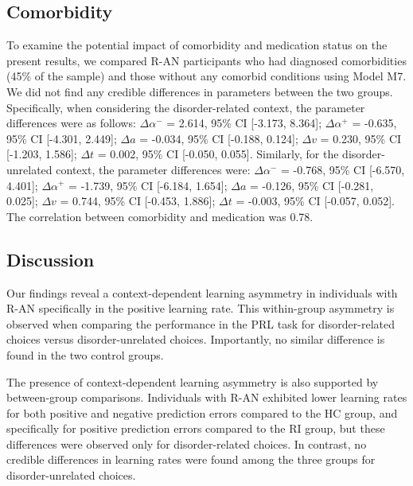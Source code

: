 \documentclass[
  man,floatsintext]{apa6}
\begin{document}
\hypertarget{comorbidity}{%
\subsection{Comorbidity}\label{comorbidity}}

To examine the potential impact of comorbidity and medication status on the present results, we compared R-AN participants who had diagnosed comorbidities (45\% of the sample) and those without any comorbid conditions using Model M7. We did not find any credible differences in parameters between the two groups. Specifically, when considering the disorder-related context, the parameter differences were as follows: \(\Delta \alpha^-\) = 2.614, 95\% CI {[}-3.173, 8.364{]}; \(\Delta \alpha^+\) = -0.635, 95\% CI {[}-4.301, 2.449{]}; \(\Delta a\) = -0.034, 95\% CI {[}-0.188, 0.124{]}; \(\Delta v\) = 0.230, 95\% CI {[}-1.203, 1.586{]}; \(\Delta t\) = 0.002, 95\% CI {[}-0.050, 0.055{]}. Similarly, for the disorder-unrelated context, the parameter differences were: \(\Delta \alpha^-\) = -0.768, 95\% CI {[}-6.570, 4.401{]}; \(\Delta \alpha^+\) = -1.739, 95\% CI {[}-6.184, 1.654{]}; \(\Delta a\) = -0.126, 95\% CI {[}-0.281, 0.025{]}; \(\Delta v\) = 0.744, 95\% CI {[}-0.453, 1.886{]}; \(\Delta t\) = -0.003, 95\% CI {[}-0.057, 0.052{]}. The correlation between comorbidity and medication was 0.78.

\hypertarget{discussion}{%
\subsection{Discussion}\label{discussion}}

Our findings reveal a context-dependent learning asymmetry in individuals with R-AN specifically in the positive learning rate. This within-group asymmetry is observed when comparing the performance in the PRL task for disorder-related choices versus disorder-unrelated choices. Importantly, no similar difference is found in the two control groups.

The presence of context-dependent learning asymmetry is also supported by between-group comparisons. Individuals with R-AN exhibited lower learning rates for both positive and negative prediction errors compared to the HC group, and specifically for positive prediction errors compared to the RI group, but these differences were observed only for disorder-related choices. In contrast, no credible differences in learning rates were found among the three groups for disorder-unrelated choices.
\end{document}
